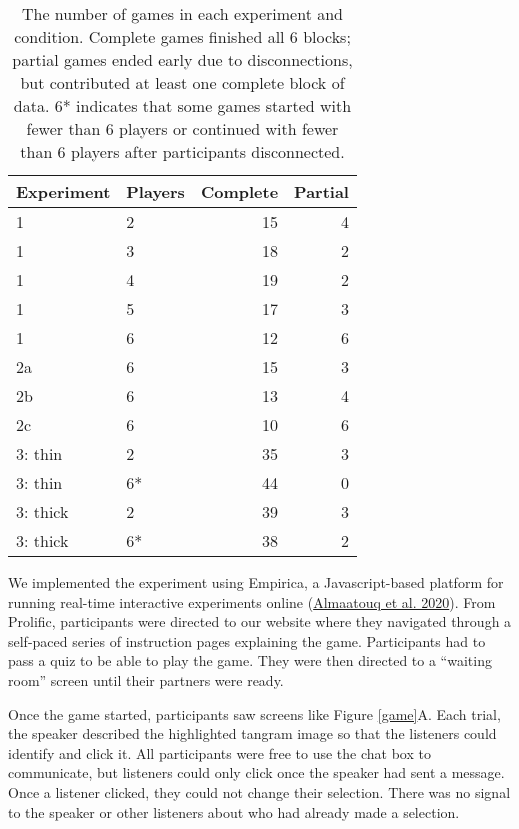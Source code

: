 \documentclass[
  english,
  a4paper,
]{article}
\begin{document}
\begin{table}

\caption{\label{tab:participants}The number of games in each experiment and condition. Complete games finished all 6 blocks; partial games ended early due to disconnections, but contributed at least one complete block of data. 6* indicates that some games started with fewer than 6 players or continued with fewer than 6 players after participants disconnected.}
\centering
\begin{tabular}[t]{l|l|r|r}
\hline
Experiment & Players & Complete & Partial\\
\hline
1 & 2 & 15 & 4\\
\hline
1 & 3 & 18 & 2\\
\hline
1 & 4 & 19 & 2\\
\hline
1 & 5 & 17 & 3\\
\hline
1 & 6 & 12 & 6\\
\hline
2a & 6 & 15 & 3\\
\hline
2b & 6 & 13 & 4\\
\hline
2c & 6 & 10 & 6\\
\hline
3: thin & 2 & 35 & 3\\
\hline
3: thin & 6* & 44 & 0\\
\hline
3: thick & 2 & 39 & 3\\
\hline
3: thick & 6* & 38 & 2\\
\hline
\end{tabular}
\end{table}

We implemented the experiment using Empirica, a Javascript-based platform for running real-time interactive experiments online (\protect\hyperlink{ref-almaatouqEmpiricaVirtualLab2020}{Almaatouq et al. 2020}). From Prolific, participants were directed to our website where they navigated through a self-paced series of instruction pages explaining the game. Participants had to pass a quiz to be able to play the game. They were then directed to a ``waiting room'' screen until their partners were ready.

Once the game started, participants saw screens like Figure \ref{game}A. Each trial, the speaker described the highlighted tangram image so that the listeners could identify and click it. All participants were free to use the chat box to communicate, but listeners could only click once the speaker had sent a message. Once a listener clicked, they could not change their selection. There was no signal to the speaker or other listeners about who had already made a selection.
\end{document}

